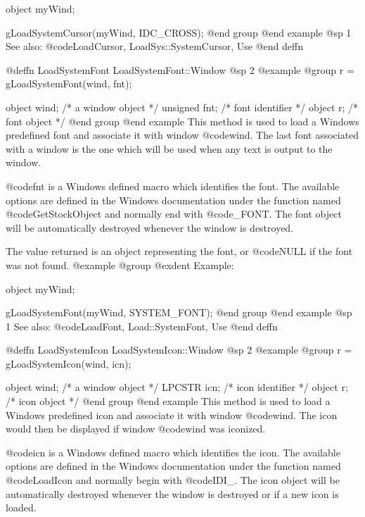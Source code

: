 object  myWind;

gLoadSystemCursor(myWind, IDC_CROSS);
@end group
@end example
@sp 1
See also:  @code{LoadCursor, LoadSys::SystemCursor, Use}
@end deffn











@deffn {LoadSystemFont} LoadSystemFont::Window
@sp 2
@example
@group
r = gLoadSystemFont(wind, fnt);

object   wind;  /*  a window object  */
unsigned fnt;   /*  font identifier  */
object   r;     /*  font object      */
@end group
@end example
This method is used to load a Windows predefined font and associate it
with window @code{wind}.  The last font associated with a window is the
one which will be used when any text is output to the window.

@code{fnt} is a Windows defined macro which identifies the font.  The
available options are defined in the Windows documentation under the
function named @code{GetStockObject} and normally end with @code{_FONT}.
The font object will be automatically destroyed whenever the window is
destroyed.

The value returned is an object representing the font, or
@code{NULL} if the font was not found.
@example
@group
@exdent Example:

object  myWind;

gLoadSystemFont(myWind, SYSTEM_FONT);
@end group
@end example
@sp 1
See also:  @code{LoadFont, Load::SystemFont, Use}
@end deffn
















@deffn {LoadSystemIcon} LoadSystemIcon::Window
@sp 2
@example
@group
r = gLoadSystemIcon(wind, icn);

object   wind;  /*  a window object  */
LPCSTR   icn;   /*  icon identifier  */
object   r;     /*  icon object      */
@end group
@end example
This method is used to load a Windows predefined icon and associate it
with window @code{wind}.  The icon would then be displayed if window
@code{wind} was iconized.

@code{icn} is a Windows defined macro which identifies the icon.  The
available options are defined in the Windows documentation under the
function named @code{LoadIcon} and normally begin with @code{IDI_}.  The
icon object will be automatically destroyed whenever the window is
destroyed or if a new icon is loaded.

